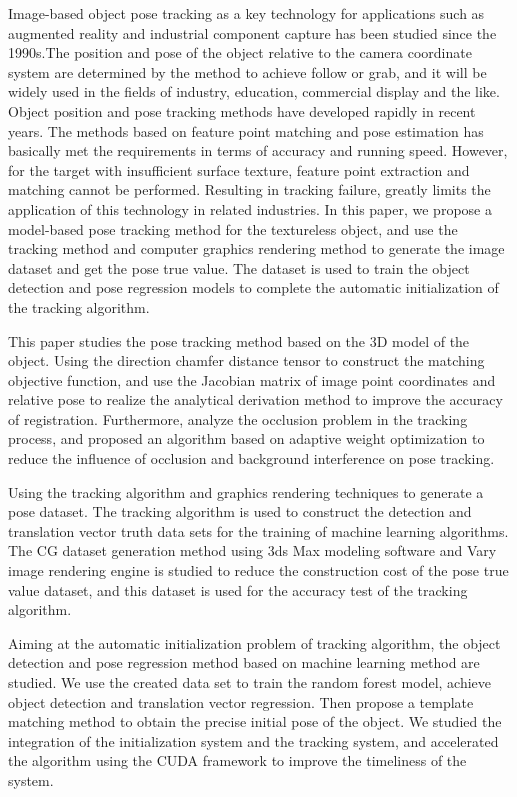 \begin{eabstract}
  Image-based object pose tracking as a key technology for applications such as augmented reality and industrial component capture has been studied since the 1990s.The position 
  and pose of the object relative to the camera coordinate system are determined by the method to achieve follow or grab, and it will be widely used in the fields of industry, 
  education, commercial display and the like. Object position and pose tracking methods have developed rapidly in recent years. The methods based on feature point matching and pose 
  estimation has basically met the requirements in terms of accuracy and running speed. However, for the target with insufficient surface texture, feature point extraction and matching
   cannot be performed. Resulting in tracking failure, greatly limits the application of this technology in related industries. In this paper, we propose a model-based pose tracking 
   method for the textureless object, and use the tracking method and computer graphics rendering method to generate the image dataset and get the pose true value. The dataset is used
    to train the object detection and pose regression models to complete the automatic initialization of the tracking algorithm.

  This paper studies the pose tracking method based on the 3D model of the object. Using the direction chamfer distance tensor to construct the matching objective function, and use the Jacobian matrix of image point coordinates and relative pose to realize the analytical derivation method to improve the accuracy of registration. Furthermore, analyze the occlusion problem in the tracking process, and proposed an algorithm based on adaptive weight optimization to reduce the influence of occlusion and background interference on pose tracking.

  Using the tracking algorithm and graphics rendering techniques to generate a pose dataset. The tracking algorithm is used to construct the detection and translation vector truth data sets for the training of machine learning algorithms. The CG dataset generation method using 3ds Max modeling software and Vary image rendering engine is studied to reduce the construction cost of the pose true value dataset, and this dataset is used for the accuracy test of the tracking algorithm.

  Aiming at the automatic initialization problem of tracking algorithm, the object detection and pose regression method based on machine learning method are studied. We use the created data set to train the random forest model, achieve object detection and translation vector regression. Then propose a template matching method to obtain the precise initial pose of the object. We studied the integration of the initialization system and the tracking system, and accelerated the algorithm using the CUDA framework to improve the timeliness of the system.


\end{eabstract}
